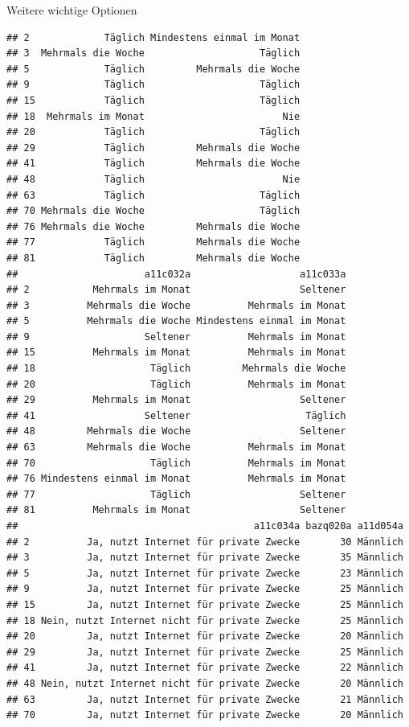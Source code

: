 \documentclass[ignorenonframetext,]{beamer}
\begin{document}
\begin{frame}[fragile]{Weitere wichtige Optionen}
\begin{verbatim}
## 2             Täglich Mindestens einmal im Monat
## 3  Mehrmals die Woche                    Täglich
## 5             Täglich         Mehrmals die Woche
## 9             Täglich                    Täglich
## 15            Täglich                    Täglich
## 18  Mehrmals im Monat                        Nie
## 20            Täglich                    Täglich
## 29            Täglich         Mehrmals die Woche
## 41            Täglich         Mehrmals die Woche
## 48            Täglich                        Nie
## 63            Täglich                    Täglich
## 70 Mehrmals die Woche                    Täglich
## 76 Mehrmals die Woche         Mehrmals die Woche
## 77            Täglich         Mehrmals die Woche
## 81            Täglich         Mehrmals die Woche
##                      a11c032a                   a11c033a
## 2           Mehrmals im Monat                   Seltener
## 3          Mehrmals die Woche          Mehrmals im Monat
## 5          Mehrmals die Woche Mindestens einmal im Monat
## 9                    Seltener          Mehrmals im Monat
## 15          Mehrmals im Monat          Mehrmals im Monat
## 18                    Täglich         Mehrmals die Woche
## 20                    Täglich          Mehrmals im Monat
## 29          Mehrmals im Monat                   Seltener
## 41                   Seltener                    Täglich
## 48         Mehrmals die Woche                   Seltener
## 63         Mehrmals die Woche          Mehrmals im Monat
## 70                    Täglich          Mehrmals im Monat
## 76 Mindestens einmal im Monat          Mehrmals im Monat
## 77                    Täglich                   Seltener
## 81          Mehrmals im Monat                   Seltener
##                                         a11c034a bazq020a a11d054a
## 2          Ja, nutzt Internet für private Zwecke       30 Männlich
## 3          Ja, nutzt Internet für private Zwecke       35 Männlich
## 5          Ja, nutzt Internet für private Zwecke       23 Männlich
## 9          Ja, nutzt Internet für private Zwecke       25 Männlich
## 15         Ja, nutzt Internet für private Zwecke       25 Männlich
## 18 Nein, nutzt Internet nicht für private Zwecke       25 Männlich
## 20         Ja, nutzt Internet für private Zwecke       20 Männlich
## 29         Ja, nutzt Internet für private Zwecke       25 Männlich
## 41         Ja, nutzt Internet für private Zwecke       22 Männlich
## 48 Nein, nutzt Internet nicht für private Zwecke       20 Männlich
## 63         Ja, nutzt Internet für private Zwecke       21 Männlich
## 70         Ja, nutzt Internet für private Zwecke       20 Männlich

\end{verbatim}
\end{frame}
\end{document}
